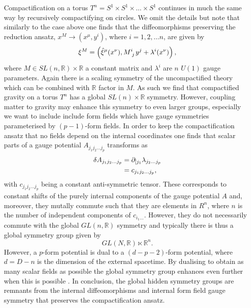 Compactification on a torus $T^n=S^1\times S^1\times\ldots\times S^1$ continues in much the same way by recursively compactifying on circles. We omit the details but note that similarly to the case above one finds that the diffeomorphisms preserving the reduction ansatz, $x^M\to (x^\mu,y^i)$, where $i=1,2,\ldots n$, are given by 
\begin{equation}
    \xi^M = \left(\hat{\xi}^\mu(x^\nu),\tensor{M}{^i_j}y^j+\lambda^i(x^\nu)\right),
\end{equation}
where $M\in SL(n,\mathbb{R})\times \mathbb{R}$ a constant matrix and $\lambda^i$ are $n$ $U(1)$ gauge parameters. Again there is a scaling symmetry of the uncompactified theory which can be combined with $\mathbb{R}$ factor in $M$. As such we find that compactified gravity on a torus $T^n$ has a global $SL(n)\times\mathbb{R}$ symmetry. However, coupling matter to gravity may enhance this symmetry to even larger groups, especially we want to include include form fields which have gauge symmetries parameterised by $(p-1)$-form fields. In order to keep the compactification ansatz that no fields depend on the internal coordinates one finds that scalar parts of a gauge potential $A_{j_1j_2\ldots j_p}$ transforms as 
\begin{equation}
    \begin{aligned}
    \delta A_{j_1j_2\ldots j_p} &= \partial_{[j_1} \lambda_{j_2\ldots j_{p}}\\
                                &= c_{j_1j_2\ldots j_p},
    \end{aligned}
\end{equation}
with $c_{j_1j_2\ldots j_p}$ being a constant anti-symmetric tensor. These corresponds to constant shifts of the purely internal components of the gauge potential $A$ and, moreover, they mutally commute such that they are elements in $R^n$, where $n$ is the number of independent components of $c_{i_1\ldots}$. However, they do not necessarily commute with the global $GL(n,\mathbb{R})$ symmetry and typically there is thus a global symmetry group given by 
\begin{equation}
    GL(N,\mathbb{R})\ltimes \mathbb{R}^n.
\end{equation}
However, a $p$-form potential is dual to a $(d-p-2)$-form potential, where $d=D-n$ is the dimension of the external spacetime. By dualising to obtain as many scalar fields as possible the global symmetry group enhances even further when this is possible \cite{Cremmer:1997ct}. In conclusion, the global hidden symmetry groups are remnants from the internal diffeomorphisms and internal form field gauge symmetry that preserves the compactification ansatz. 

